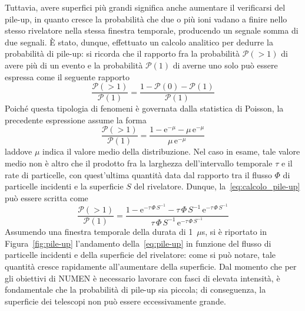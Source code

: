 Tuttavia, avere superfici più grandi significa anche aumentare il verificarsi del pile-up, in quanto cresce la probabilità che due o più ioni vadano a finire nello stesso rivelatore nella stessa finestra temporale, producendo un segnale somma di due segnali.
È stato, dunque, effettuato un calcolo analitico per dedurre la probabilità di pile-up: si ricorda che il rapporto fra la probabilità $\mathcal{P}(> \! 1)$ di avere più di un evento e la probabilità $\mathcal{P}(1)$ di averne uno solo può essere espressa come il seguente rapporto
\begin{equation}
	\frac{\mathcal{P}(> \! 1)}{\mathcal{P}(1)} = \frac{1 - 
	\mathcal{P}(0) - \mathcal{P}(1)}{\mathcal{P}(1)}
\end{equation}
Poiché questa tipologia di fenomeni è governata dalla statistica di Poisson, la precedente espressione assume la forma
\begin{equation}
\frac{\mathcal{P}(> \! 1)}{\mathcal{P}(1)} = \frac{1 - 
	\mbox{e}^{-\mu} - \mu \,\mbox{e}^{- \mu}}{\mu \, \mbox{e}^{- \mu}}
\end{equation} \label{eq:calcolo_pile-up}
laddove $\mu$ indica il valore medio della distribuzione.
Nel caso in esame, tale valore medio non è altro che il prodotto fra la larghezza dell'intervallo temporale $\tau$ e il rate di particelle, con quest'ultima quantità data dal rapporto tra il flusso $\Phi$ di particelle incidenti e la superficie $S$ del rivelatore.
Dunque, la~\ref{eq:calcolo_pile-up} può essere scritta come
\begin{equation}
\frac{\mathcal{P}(> \! 1)}{\mathcal{P}(1)} = \frac{1 - 
	\mbox{e}^{- \tau \, \Phi \, S^{-1}} - \tau \, \Phi \, S^{-1} \,\mbox{e}^{- \tau\, \Phi \, S^{-1}}}{\tau \, \Phi \, S^{-1} \, \mbox{e}^{- \tau \, \Phi \, S^{-1}}}
\end{equation} \label{eq:pile-up}
Assumendo una finestra temporale della durata di 1~$\mu$s, si è riportato in Figura~\ref{fig:pile-up} l'andamento della~\ref{eq:pile-up} in funzione del flusso di particelle incidenti e della superficie del rivelatore: come si può notare, tale quantità cresce rapidamente all'aumentare della superficie.
Dal momento che per gli obiettivi di NUMEN è necessario lavorare con fasci di elevata intensità, è fondamentale che la probabilità di pile-up sia piccola; di conseguenza, la superficie dei telescopi non può essere eccessivamente grande.


